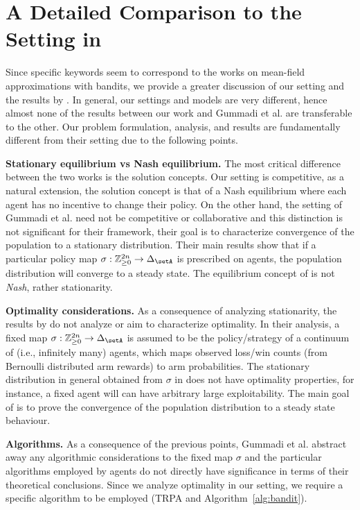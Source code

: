 
\section{A Detailed Comparison to the Setting in \cite{gummadi2013mean}}\label{sec:detailed_comparison}

Since specific keywords seem to correspond to the works on mean-field approximations with bandits, we provide a greater discussion of our setting and the results by \citet{gummadi2013mean}.
In general, our settings and models are very different, hence almost none of the results between our work and Gummadi et al. are transferable to the other.
Our problem formulation, analysis, and results are fundamentally different from their setting due to the following points.

\textbf{Stationary equilibrium vs Nash equilibrium.}
The most critical difference between the two works is the solution concepts.
Our setting is competitive, as a natural extension, the solution concept is that of a Nash equilibrium where each agent has no incentive to change their policy.
On the other hand, the setting of Gummadi et al. need not be competitive or collaborative and this distinction is not significant for their framework, their goal is to characterize convergence of the population to a stationary distribution.
Their main results show that if a particular policy map $\sigma: \mathbb{Z}_{\geq 0}^{2 n} \rightarrow \Delta_\setA$ is prescribed on agents, the population distribution will converge to a steady state.
The equilibrium concept of \cite{gummadi2013mean} is not \emph{Nash}, rather stationarity.

\textbf{Optimality considerations.}
As a consequence of analyzing stationarity, the results by \citep{gummadi2013mean} do not analyze or aim to characterize optimality.
In their analysis, a fixed map $\sigma: \mathbb{Z}_{\geq 0}^{2 n} \rightarrow \Delta_\setA$ is assumed to be the policy/strategy of a continuum of (i.e., infinitely many) agents, which maps observed loss/win counts (from Bernoulli distributed arm rewards) to arm probabilities.
The stationary distribution in general obtained from $\sigma$ in \cite{gummadi2013mean} does not have optimality properties, for instance, a fixed agent will can have arbitrary large exploitability.
The main goal of \cite{gummadi2013mean} is to prove the convergence of the population distribution to a steady state behaviour.

\textbf{Algorithms.}
As a consequence of the previous points, Gummadi et al. abstract away any algorithmic considerations to the fixed map $\sigma$ and the particular algorithms employed by agents do not directly have significance in terms of their theoretical conclusions.
Since we analyze optimality in our setting, we require a specific algorithm to be employed (TRPA and Algorithm~\ref{alg:bandit}).

